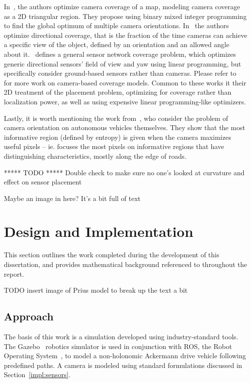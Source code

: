 \documentclass[a4paper,12pt,twoside,openright]{report}
\begin{document}
In~\cite{horster2006optimal}, the authors optimize camera coverage of a map,
modeling camera coverage as a 2D triangular region. They propose using binary
mixed integer programming to find the global optimum of multiple camera orientations.
In~\cite{wang2013achieving} the authors optimize directional coverage, that is
the fraction of the time cameras can achieve a specific view of the object, defined
by an orientation and an allowed angle about it.~\cite{osais2010directional} defines
a general sensor network coverage problem, which optimizes generic directional sensors'
field of view and yaw using linear programming, but specifically consider ground-based
sensors rather than cameras. Please refer to~\cite{guvensan2011coverage} for more work
on camera-based coverage models. Common to these works it their 2D treatment of the placement
problem, optimizing for coverage rather than localization power,
as well as using expensive linear programming-like optimizers.


Lastly, it is worth mentioning the work from~\citeauthor{bansal2014understanding}\cite{bansal2014understanding}, 
who consider the problem of camera orientation on autonomous vehicles themselves.
They show that the most informative region (defined by entropy) is given when the 
camera maximizes useful pixels -- ie. focuses the most pixels on informative regions
that have distinguishing characteristics, mostly along the edge of roads.


***** TODO *****
Double check to make sure no one's looked at curvature and effect on sensor placement

Maybe an image in here? It's a bit full of text


\chapter{Design and Implementation}
\label{chap:impl}

This section outlines the work completed during the development
of this dissertation, and provides mathematical background
referenced to throughout the report.

TODO insert image of Prius model to break up the text a bit
 
\section{Approach}

The basis of this work is a simulation developed using industry-standard tools.
The Gazebo~\cite{koenig2004design} robotics simulator is used in conjunction with ROS,
the Robot Operating System~\cite{quigley2009ros}, to model a non-holonomic Ackermann drive vehicle
following predefined paths. A camera is modeled using standard formulations
discussed in Section~\ref{impl:sensors}.
\end{document}
